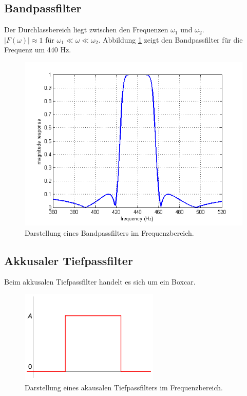 \subsection*{Bandpassfilter}
Der Durchlassbereich liegt zwischen den Frequenzen $\omega_{1}$ und $\omega_{2}$. \\
$\vert F(\omega) \vert \approx 1 $ für $\omega_{1} \ll\omega \ll\omega_{2}$. Abbildung \ref{fig:filt_bandpass} zeigt den Bandpassfilter für die Frequenz um 440 Hz. 
\begin{figure}[h!]
\centering
\includegraphics[width=.4\tw]{fig/08-Filter/bandpass.png}
\caption{Darstellung eines Bandpassfilters im Frequenzbereich.}
\label{fig:filt_bandpass}
\end{figure}

\subsection*{Akkusaler Tiefpassfilter}
Beim akkusalen Tiefpassfilter handelt es sich um ein Boxcar. 
\begin{figure}[h!]
\centering
\includegraphics[width=.6\tw]{fig/08-Filter/boxcar.png}
\caption{Darstellung eines akausalen Tiefpassfilters im Frequenzbereich.}
\end{figure}